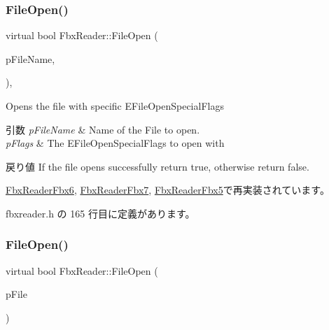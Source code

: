 \subsubsection{\texorpdfstring{File\+Open()}{FileOpen()}\hspace{0.1cm}{\footnotesize\ttfamily [3/4]}}
{\footnotesize\ttfamily virtual bool Fbx\+Reader\+::\+File\+Open (\begin{DoxyParamCaption}\item[{char $\ast$}]{p\+File\+Name,  }\item[{\hyperlink{class_fbx_reader_a1a14bd907bcda7dd48ba9b0a6236b7b8}{E\+File\+Open\+Special\+Flags}}]{ }\end{DoxyParamCaption})\hspace{0.3cm}{\ttfamily [inline]}, {\ttfamily [virtual]}}

Opens the file with specific E\+File\+Open\+Special\+Flags 
\begin{DoxyParams}{引数}
{\em p\+File\+Name} & Name of the File to open. \\
\hline
{\em p\+Flags} & The E\+File\+Open\+Special\+Flags to open with \\
\hline
\end{DoxyParams}
\begin{DoxyReturn}{戻り値}
If the file opens successfully return true, otherwise return false. 
\end{DoxyReturn}


\hyperlink{class_fbx_reader_fbx6_a9a28e37abe39c65e899a9c6f0b705756}{Fbx\+Reader\+Fbx6}, \hyperlink{class_fbx_reader_fbx7_a003c93fdf81dc99380d0276e7643ac26}{Fbx\+Reader\+Fbx7}, \hyperlink{class_fbx_reader_fbx5_aa197089a894684834388a2caf43145e3}{Fbx\+Reader\+Fbx5}で再実装されています。



 fbxreader.\+h の 165 行目に定義があります。

\mbox{\label{class_fbx_reader_a9e334ad0c2abd069c35a016413a8adcd}} 
\subsubsection{\texorpdfstring{File\+Open()}{FileOpen()}\hspace{0.1cm}{\footnotesize\ttfamily [4/4]}}
{\footnotesize\ttfamily virtual bool Fbx\+Reader\+::\+File\+Open (\begin{DoxyParamCaption}\item[{\hyperlink{class_fbx_file}{Fbx\+File} $\ast$}]{p\+File }\end{DoxyParamCaption})\hspace{0.3cm}{\ttfamily [virtual]}}



